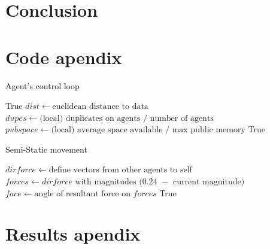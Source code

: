 \documentclass{UoYCSproject}
\begin{document}


\chapter{Conclusion}
\label{cha:conclusion}


\appendix
\chapter{Code apendix}

\begin{algorithm}
\caption{Agent's control loop}
\label{Agent_Control_Loop2}
\begin{algorithmic}[1]
\State {}
\State
{}
\State {}
\State \Return True
\EndIf
\State
\State $dist \gets \text{euclidean distance to data}$
\State $dupes \gets \text{(local) duplicates on agents / number of agents}$
\State $pub space \gets \text{(local) average space available / max public memory}$
\State
{}
\State {}
\EndIf
\State
{}
\State {}
\EndIf
\State
\State {}
\State
\State \Return True
\EndProcedure
\end{algorithmic}
\end{algorithm}


\begin{algorithm}
\caption{Semi-Static movement}
\label{semistaticmove}
\begin{algorithmic}[1]
\State $dirforce \gets \text{define vectors from other agents to self}$
\State $forces \gets \text{$dirforce$ with magnitudes $($0.24 $-$ current magnitude$)$}$
\State
\State {}
\State
\State $face \gets \text{angle of resultant force on $forces$}$
\State {}
\State
\State \Return True
\EndProcedure
\end{algorithmic}
\end{algorithm}



\chapter{Results apendix}
\end{document}
